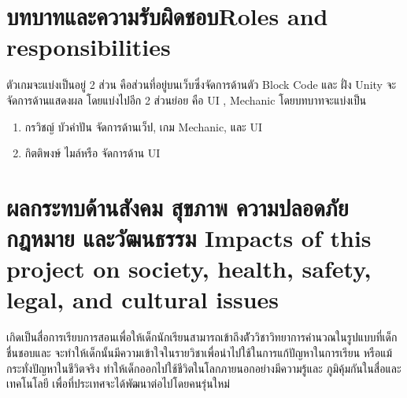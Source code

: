 \section{\ifcpe บทบาทและความรับผิดชอบ\else Roles and responsibilities\fi}
ตัวเกมจะแบ่งเป็นอยู่ 2 ส่วน คือส่วนที่อยู่บนเว็บซึ่งจัดการด้านตัว Block Code และ ฝั่ง Unity จะจัดการด้านแสดงผล โดยแบ่งไปอีก
2 ส่วนย่อย คือ UI , Mechanic โดยบทบาทจะแบ่งเป็น
\begin{enumerate}
    \item กรวิชญ์ บัวคำปัน จัดการด้านเว็ป, เกม Mechanic, และ UI
    \item กิตติพงษ์ ไมล์หรือ จัดการด้าน UI
\end{enumerate}

\section{\ifcpe%
ผลกระทบด้านสังคม สุขภาพ ความปลอดภัย กฎหมาย และวัฒนธรรม
\else%
Impacts of this project on society, health, safety, legal, and cultural issues
\fi}

เกิดเป็นสื่อการเรียบการสอนเพื่อให้เด็กนักเรียนสามารถเข้าถึงตััววิชาวิทยาการคำนวณในรูปแบบที่เด็กชื่นชอบและ
จะทำให้เด็กนั้นมีความเข้าใจในรายวิชาเพื่อนำไปใช้ในการแก้ปัญหาในการเรียน หรือแม้กระทั่งปัญหาในชีวิตจริง ทำให้เด็กออกไปใช้ชีวิตในโลกภายนอกอย่างมีความรู้และ
ภูมิคุ้มกันในสื่อและเทคโนโลยี เพื่อที่ประเทศจะได้พัฒนาต่อไปโดยคนรุ่นใหม่